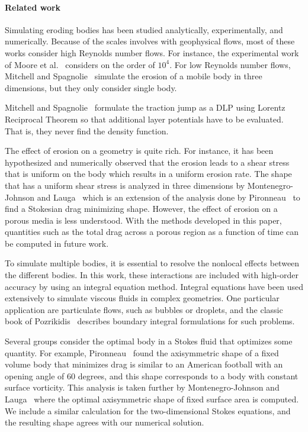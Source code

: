 \documentclass[preprint, 10pt]{elsarticle}
\begin{document}
\paragraph{Related work} Simulating eroding bodies has been studied
analytically, experimentally, and numerically.  Because of the scales
involves with geophysical flows, most of these works consider high
Reynolds number flows.  For instance, the experimental work of Moore et
al.~\cite{moo-ris-chi-zha-she2013} considers on the order of $10^4$.
For low Reynolds number flows, Mitchell and Spagnolie~\cite{mit-spa2016}
simulate the erosion of a mobile body in three dimensions, but they only
consider single body.  

Mitchell and Spagnolie~\cite{mit-spa2016} formulate the traction jump as
a DLP using Lorentz Reciprocal Theorem so that additional layer
potentials have to be evaluated.  That is, they never find the density
function.

The effect of erosion on a geometry is quite rich.  For instance, it has
been hypothesized and numerically observed that the erosion leads to a
shear stress that is uniform on the body which results in a uniform
erosion rate.  The shape that has a uniform shear stress is analyzed in
three dimensions by Montenegro-Johnson and Lauga~\cite{mon-lau2015}
which is an extension of the analysis done by Pironneau~\cite{pir1973}
to find a Stokesian drag minimizing shape.  However, the effect of
erosion on a porous media is less understood.  With the methods
developed in this paper, quantities such as the total drag across a
porous region as a function of time can be computed in future work.

To simulate multiple bodies, it is essential to resolve the nonlocal
effects between the different bodies.  In this work, these interactions
are included with high-order accuracy by using an integral equation
method.  Integral equations have been used extensively to simulate
viscous fluids in complex geometries.  One particular application are
particulate flows, such as bubbles or droplets, and the classic book of
Pozrikidis~\cite{poz1992} describes boundary integral formulations for
such problems.

Several groups consider the optimal body in a Stokes fluid that
optimizes some quantity.  For example, Pironneau~\cite{pir1973} found
the axisymmetric shape of a fixed volume body that minimizes drag is
similar to an American football with an opening angle of 60 degrees, and
this shape corresponds to a body with constant surface vorticity.  This
analysis is taken further by Montenegro-Johnson and
Lauga~\cite{mon-lau2015} where the optimal axisymmetric shape of fixed
surface area is computed.  We include a similar calculation for the
two-dimensional Stokes equations, and the resulting shape agrees with
our numerical solution. 
\end{document}
